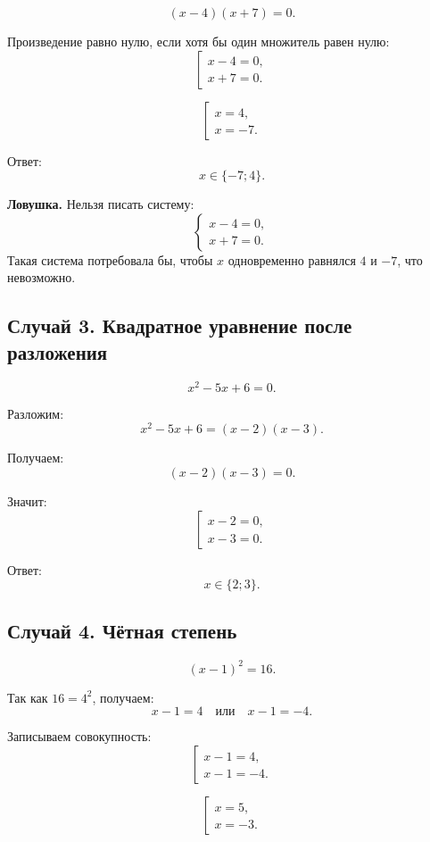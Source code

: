 \documentclass[a4paper,12pt]{article}
\newcommand{\important}[1]{\textcolor{darkaccent}{\textbf{#1}}}
\begin{document}
\[
(x-4)(x+7)=0.
\]

Произведение равно нулю, если хотя бы один множитель равен нулю:
\[
\left[
\begin{array}{l}
x-4=0,\\
x+7=0.
\end{array}
\right.
\]

\[
\left[
\begin{array}{l}
x=4,\\
x=-7.
\end{array}
\right.
\]

Ответ:
\[
\boxed{x\in\{-7;4\}}.
\]

\important{Ловушка.} Нельзя писать систему:
\[
\begin{cases}
x-4=0,\\
x+7=0.
\end{cases}
\]
Такая система потребовала бы, чтобы $x$ одновременно равнялся $4$ и $-7$, что невозможно.

\subsection*{Случай 3. Квадратное уравнение после разложения}

\[
x^2-5x+6=0.
\]

Разложим:
\[
x^2-5x+6=(x-2)(x-3).
\]

Получаем:
\[
(x-2)(x-3)=0.
\]

Значит:
\[
\left[
\begin{array}{l}
x-2=0,\\
x-3=0.
\end{array}
\right.
\]

Ответ:
\[
\boxed{x\in\{2;3\}}.
\]

\subsection*{Случай 4. Чётная степень}

\[
(x-1)^2=16.
\]

Так как $16=4^2$, получаем:
\[
x-1=4
\quad\text{или}\quad
x-1=-4.
\]

Записываем совокупность:
\[
\left[
\begin{array}{l}
x-1=4,\\
x-1=-4.
\end{array}
\right.
\]

\[
\left[
\begin{array}{l}
x=5,\\
x=-3.
\end{array}
\right.
\]
\end{document}

